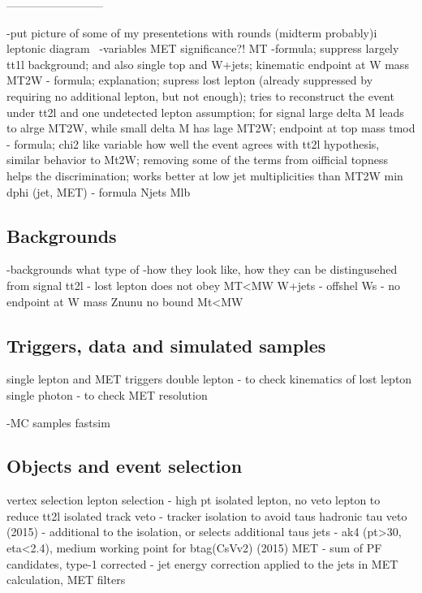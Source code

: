 

--------------------------

-put picture of some of my presentetions with rounds (midterm probably)i
leptonic diagram~\cite{CMS:2016vew}
-variables
	MET significance?!
	MT -formula; suppress largely tt1l background; and also single top and W+jets; kinematic endpoint at W mass
	MT2W - formula; explanation; supress lost lepton (already suppressed by requiring no additional lepton, but not enough); tries to reconstruct the event under tt2l and one undetected lepton assumption; for signal large delta M leads to alrge MT2W, while small delta M has lage MT2W; endpoint at top mass
	tmod - formula; chi2 like variable how well the event agrees with tt2l hypothesis, similar behavior to Mt2W; removing some of the terms from oifficial topness helps the discrimination; works better at low jet multiplicities than MT2W
	min dphi (jet, MET) - formula
        Njets
	Mlb

\subsection{Backgrounds}
-backgrounds 
	what type of
-how they look like, how they can be distingusehed from signal
	tt2l - lost lepton does not obey MT<MW
	W+jets - offshel Ws - no endpoint at W mass
	Znunu no bound Mt<MW

\subsection{Triggers, data and simulated samples}

	single lepton and MET triggers
	double lepton - to check kinematics of lost lepton
	single photon - to check MET resolution

-MC samples
	fastsim

\subsection{Objects and event selection}
	vertex selection 
	lepton selection - high pt isolated lepton, no veto lepton to reduce tt2l
	isolated track veto - tracker isolation to avoid taus
	hadronic tau veto (2015) - additional to the isolation, or selects additional taus
	jets - ak4 (pt>30, eta<2.4), medium working point for btag(CsVv2) (2015)
	MET - sum of PF candidates, type-1 corrected - jet energy correction applied to the jets in MET calculation, MET filters


